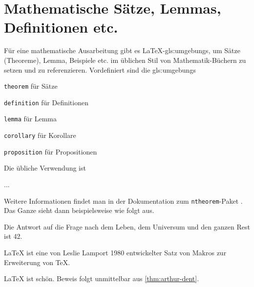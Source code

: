 \section{Mathematische Sätze, Lemmas, Definitionen etc.}%
\label{sec:Theoreme}
%
Für eine mathematische Ausarbeitung gibt es LaTeX-\glspl{gls:umgebung}, um
Sätze (Theoreme), Lemma,
Beispiele etc. im üblichen Stil von
Mathematik-Büchern zu setzen und zu referenzieren. Vordefiniert sind die
\glspl{gls:umgebung}
\begin{itemize*}
  \item \texttt{theorem} für Sätze
  \item \texttt{definition} für Definitionen
  \item \texttt{lemma} für Lemma
  \item \texttt{corollary} für Korollare
  \item \texttt{proposition} für Propositionen
\end{itemize*}
Die übliche Verwendung ist
\begin{latex}[caption={Beispiel für Theorem-Umgebungen},label={lst:ntheorem}]
\begin{theorem}\label{thm:my-theorem}
...
\end{theorem}
\end{latex}
Weitere Informationen findet man in der Dokumentation zum \texttt{ntheorem}-Paket
\parencite{May2011}. Das Ganze sieht dann beispielsweise wie folgt aus.

\begin{theorem}
\label{thm:arthur-dent} Die Antwort auf die Frage nach dem Leben, dem Universum und den ganzen Rest ist 42.
\end{theorem}

\begin{definition}
\LaTeX{} ist eine von Leslie Lamport 1980 entwickelter Satz von Makros zur Erweiterung von \TeX.
\end{definition}

\begin{proposition}
LaTeX ist schön. Beweis folgt unmittelbar aus \cref{thm:arthur-dent}.
\end{proposition}
